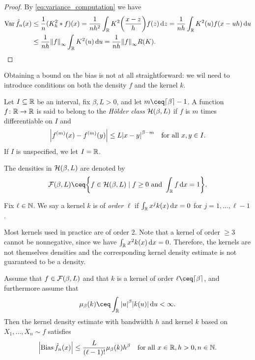 \begin{proof}
	By \cref{eq:variance_computation} we have
	\begin{align*}
	\operatorname{Var} \hat f_n(x) &\leq \frac1n (K_h^2 * f)(x) = \frac{1}{nh^2} \int_\mathbb R K^2\qty(\frac{x - z}{h}) f(z) \dd{z} = \frac{1}{nh} \int_\mathbb R K^2(u) f(x - uh) \dd{u} \\
	&\leq \frac1{nh} \norm{f}_\infty \int_\mathbb R K^2(u) \dd{u} = \frac{1}{nh} \norm{f}_\infty R(K). 
	\end{align*}
\end{proof}

Obtaining a bound on the bias is not at all straightforward: we wil need to introduce conditions on both the density $f$ and the kernel $k$. 
\begin{definition}
	Let $I \subseteq \mathbb R$ be an interval, fix $\beta, L > 0$, and let $m \ceq \ceil{\beta} - 1$. A function $f \colon \mathbb R \to \mathbb R$ is said to belong to the \emph{Hölder class} $\mathcal H(\beta, L)$ if $f$ is $m$ times differentiable on $I$ and
	\[
	\abs{f^{(m)}(x) - f^{(m)}(y)} \leq L \abs{x - y}^{\beta - m} \quad\text{for all $x, y \in I$}. 
	\]
	If $I$ is unspecified, we let $I = \mathbb R$. 
	
	The densities in $\mathcal H(\beta, L)$ are denoted by
	\[
	\FF(\beta, L) \ceq \qty{f \in \HH(\beta, L) \mid f \geq 0 \text{ and } \int_\RR f \dd{x} = 1}. 
	\]
\end{definition}

\begin{definition}
	Fix $\ell \in \mathbb N$. We say a kernel $k$ is of \emph{order} $\ell$ if $\int_\mathbb R x^j k(x) \dd{x} =0 $ for $j = 1, \dotsc, \ell - 1$. 
\end{definition}

\begin{remark}
	Most kernels used in practice are of order 2. Note that a kernel of order $\geq 3$ cannot be nonnegative, since we have $\int_\mathbb R x^2k(x) \dd{x} = 0$. Therefore, the kernels are not themselves densities and the corresponding kernel density estimate is not guaranteed to be a density. 
\end{remark}

\begin{proposition} \label{prop:bias_bound}
	Assume that $f \in \mathcal F(\beta, L)$ and that $k$ is a kernel of order $\ell \ceq \ceil{\beta}$, and furthermore assume that
	\[
	\mu_\beta(k) \ceq \int_\RR \abs{u}^\beta \abs{k(u)} \dd{u} < \infty. 
	\]
	Then the kernel density estimate with bandwidth $h$ and kernel $k$ based on $X_1, \dotsc, X_n \sim f$ satisfies
	\[
	\abs{\operatorname{Bias} \hat f_n(x)} \leq \frac{L}{(\ell - 1)!} \mu_\beta(k) h^\beta \quad\text{for all $x \in \mathbb R, h > 0, n \in \mathbb N$}. 
	\]
\end{proposition}


